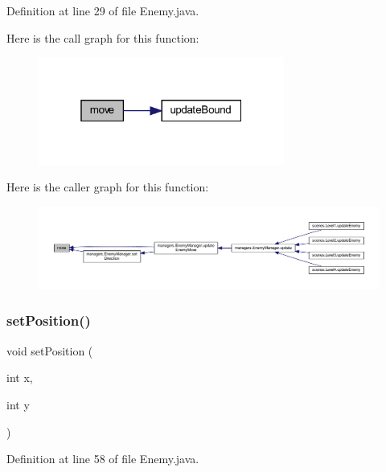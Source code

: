 Definition at line 29 of file Enemy.\+java.

Here is the call graph for this function\+:\nopagebreak
\begin{figure}[H]
\begin{center}
\leavevmode
\includegraphics[width=229pt]{classenemies_1_1_enemy_a474fd9bb876d55f65850132777c539d8_cgraph}
\end{center}
\end{figure}
Here is the caller graph for this function\+:
\nopagebreak
\begin{figure}[H]
\begin{center}
\leavevmode
\includegraphics[width=350pt]{classenemies_1_1_enemy_a474fd9bb876d55f65850132777c539d8_icgraph}
\end{center}
\end{figure}
\mbox{\label{classenemies_1_1_enemy_ad6c107fadf835c74a229f8cac0cc98ab}} 
\subsubsection{\texorpdfstring{set\+Position()}{setPosition()}}
{\footnotesize\ttfamily void set\+Position (\begin{DoxyParamCaption}\item[{int}]{x,  }\item[{int}]{y }\end{DoxyParamCaption})}



Definition at line 58 of file Enemy.\+java.

